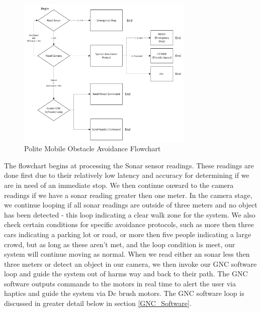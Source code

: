 \begin{figure}[H]
	\centering
	\includegraphics[width=0.75\textwidth]{./Images/Polite-Mobile-Obstacle-Avoidance-Flowchart.png}
	\caption{\label{fig:Polite-Mobile-Obstacle-Avoidance-Flowchart}Polite Mobile Obstacle Avoidance Flowchart}
\end{figure}

\noindent The flowchart begins at processing the Sonar sensor readings. These readings are done first due to their relatively low latency and accuracy for determining if we are in need of an immediate stop. We then continue onward to the camera readings if we have a sonar reading greater then one meter. In the camera stage, we continue looping if all sonar readings are outside of three meters and no object has been detected - this loop indicating a clear walk zone for the system. We also check certain conditions for specific avoidance protocols, such as more then three cars indicating a parking lot or road, or more then five people indicating a large crowd, but as long as these aren't met, and the loop condition is meet, our system will continue moving as normal. When we read either an sonar less then three meters or detect an object in our camera, we then invoke our GNC software loop and guide the system out of harms way and back to their path. The GNC software outputs commands to the motors in real time to alert the user via haptics and guide the system via Dc brush motors. The GNC software loop is discussed in greater detail below in section \ref{GNC_Software}. \\

